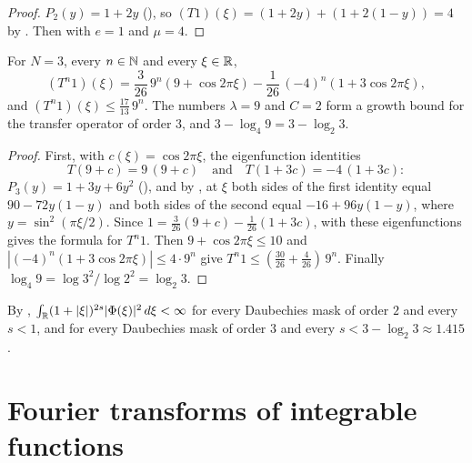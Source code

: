 \begin{proof}
\leanok
{}
$P_2(y) = 1 + 2y$ (), so $(T 1)(\xi) = (1 + 2y) + (1 + 2(1 - y)) = 4$ by
. Then  with $e = 1$ and $\mu = 4$.
\end{proof}

\begin{proposition}
\label{prop:daub-transfer-three}
\leanok
{}
For $N = 3$, every $n \in \mathbb{N}$ and every $\xi \in \mathbb{R}$,
\[
  (T^n 1)(\xi) = \frac{3}{26} \, 9^n (9 + \cos 2\pi\xi)
    - \frac{1}{26} \, (-4)^n (1 + 3 \cos 2\pi\xi) ,
\]
and $(T^n 1)(\xi) \leq \frac{17}{13} \, 9^n$. The numbers $\lambda = 9$ and $C = 2$ form a
growth bound for the transfer operator of order $3$, and $3 - \log_4 9 = 3 - \log_2 3$.
\end{proposition}

\begin{proof}
\leanok
{}
First, with $c(\xi) = \cos 2\pi\xi$, the eigenfunction identities
\[
  T (9 + c) = 9 \, (9 + c) \quad\text{and}\quad T (1 + 3c) = -4 \, (1 + 3c) :
\]
$P_3(y) = 1 + 3y + 6y^2$ (), and by , at
$\xi$ both sides of the first identity equal $90 - 72 y(1 - y)$ and both sides of the second
equal $-16 + 96 y(1 - y)$, where $y = \sin^2(\pi\xi/2)$. Since
$1 = \frac{3}{26} (9 + c) - \frac{1}{26} (1 + 3c)$,  with these
eigenfunctions gives the formula for $T^n 1$. Then $9 + \cos 2\pi\xi \leq 10$ and
$|(-4)^n (1 + 3 \cos 2\pi\xi)| \leq 4 \cdot 9^n$ give
$T^n 1 \leq (\frac{30}{26} + \frac{4}{26}) \, 9^n$. Finally
$\log_4 9 = \log 3^2 / \log 2^2 = \log_2 3$.
\end{proof}

By , $\int_{\mathbb{R}} (1 + |\xi|)^{2s} |\Phi(\xi)|^2 \, d\xi < \infty$ for every
Daubechies mask of order $2$ and every $s < 1$, and for every Daubechies mask of order $3$ and
every $s < 3 - \log_2 3 \approx 1.415$.

\section{Fourier transforms of integrable functions}

